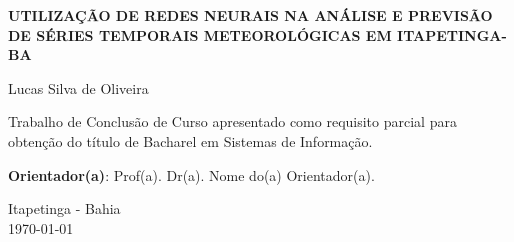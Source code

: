 \documentclass[12pt, openright, a4paper, brazil, oneside]{abntex2}
\begin{document}
    \begin{folhaderosto}

        \begin{center}
            \ABNTEXchapterfont\bfseries\LARGE UTILIZAÇÃO DE REDES NEURAIS NA ANÁLISE E PREVISÃO DE SÉRIES TEMPORAIS METEOROLÓGICAS EM ITAPETINGA-BA
        \end{center}

        \vspace{4cm}

        \begin{center}
            {\ABNTEXchapterfont\large Lucas Silva de Oliveira}
        \end{center}

        \vspace{4cm}

        \vspace*{\fill}
        \begin{flushright}
            \begin{minipage}{8.6cm}
                Trabalho de Conclusão de Curso apresentado como 
                requisito parcial para obtenção 
                do título de Bacharel em Sistemas de Informação.
                
                \vspace{0.5cm}
                \textbf{Orientador(a)}: Prof(a). Dr(a). Nome do(a) Orientador(a).
            \end{minipage}
        \end{flushright}

        \vspace{5.5cm}

        \begin{center}
            \large Itapetinga - Bahia\\
            \today
        \end{center}

    \end{folhaderosto}
\end{document}
